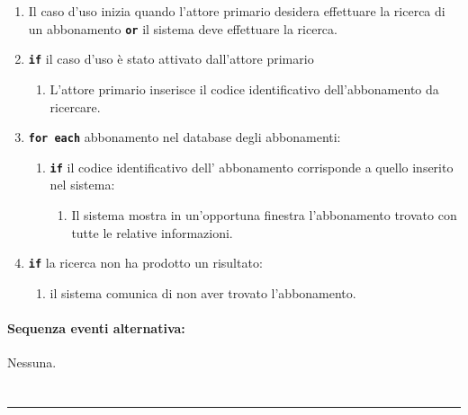 \documentclass{article}
\begin{document}
	\begin{enumerate}[itemsep=8pt,parsep=0pt]

		\item Il caso d'uso inizia quando l'attore primario desidera effettuare la ricerca di un abbonamento \texttt{\textbf{or}} il sistema deve effettuare la ricerca.
        \item \texttt{\textbf{if}} il caso d'uso è stato attivato dall'attore primario
      	  \begin{enumerate}	[leftmargin=28pt]
			\item L'attore primario inserisce il codice identificativo dell'abbonamento da ricercare.
	 	  \end{enumerate}
\item \texttt{\textbf{for each}} abbonamento nel database degli abbonamenti:
\begin{enumerate}
		\item \texttt{\textbf{if}} il codice identificativo dell' abbonamento corrisponde a quello inserito nel sistema:
		\begin{enumerate}	[leftmargin=28pt]
		    \item Il sistema mostra in un'opportuna finestra l'abbonamento trovato con tutte le relative informazioni.
		\end{enumerate}
		\end{enumerate}
		\item \texttt{\textbf{if}} la ricerca non ha prodotto un risultato:
		\begin{enumerate}	[leftmargin=28pt]
		    \item il sistema comunica di non aver trovato l'abbonamento.
		\end{enumerate}

	\end{enumerate}
	
	\paragraph{Sequenza eventi alternativa:}Nessuna.



\section*{}
\par\noindent\rule{\textwidth}{0.4pt}
\end{document}
